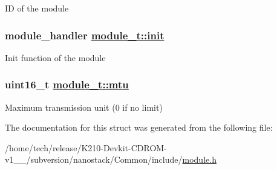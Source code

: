 ID of the module \hypertarget{structmodule__t_44cda748f1cc718519c176a1c93cf6e4}{
\subsubsection[init]{\setlength{\rightskip}{0pt plus 5cm}module\_\-handler \hyperlink{structmodule__t_44cda748f1cc718519c176a1c93cf6e4}{module\_\-t::init}}}
\label{structmodule__t_44cda748f1cc718519c176a1c93cf6e4}


Init function of the module \hypertarget{structmodule__t_f6fc529e7214ed8ba022da36b7e414a1}{
\subsubsection[mtu]{\setlength{\rightskip}{0pt plus 5cm}uint16\_\-t \hyperlink{structmodule__t_f6fc529e7214ed8ba022da36b7e414a1}{module\_\-t::mtu}}}
\label{structmodule__t_f6fc529e7214ed8ba022da36b7e414a1}


Maximum transmission unit (0 if no limit) 

The documentation for this struct was generated from the following file:\begin{CompactItemize}
\item 
/home/tech/release/K210-Devkit-CDROM-v1\_\_/subversion/nanostack/Common/include/\hyperlink{module_8h}{module.h}\end{CompactItemize}
